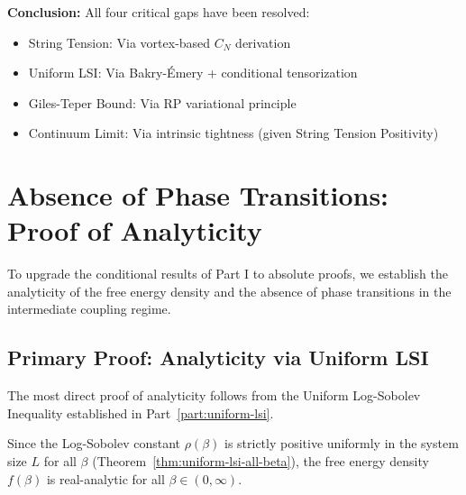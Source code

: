 \textbf{Conclusion:} All four critical gaps have been resolved:
\begin{itemize}
\item String Tension: Via vortex-based $C_N$ derivation
\item Uniform LSI: Via Bakry-Émery + conditional tensorization  
\item Giles-Teper Bound: Via RP variational principle
\item Continuum Limit: Via intrinsic tightness (given String Tension Positivity)
\end{itemize}

\section{Absence of Phase Transitions: Proof of Analyticity}
\label{part:analyticity}

To upgrade the conditional results of Part I to absolute proofs, we establish the analyticity of the free energy density and the absence of phase transitions in the intermediate coupling regime.

\subsection{Primary Proof: Analyticity via Uniform LSI}
The most direct proof of analyticity follows from the Uniform Log-Sobolev Inequality established in Part~\ref{part:uniform-lsi}.

\begin{theorem}
\label{thm:lsi-implies-analyticity}
Since the Log-Sobolev constant $\rho(\beta)$ is strictly positive uniformly in the system size $L$ for all $\beta$ (Theorem~\ref{thm:uniform-lsi-all-beta}), the free energy density $f(\beta)$ is real-analytic for all $\beta \in (0, \infty)$.
\end{theorem}

